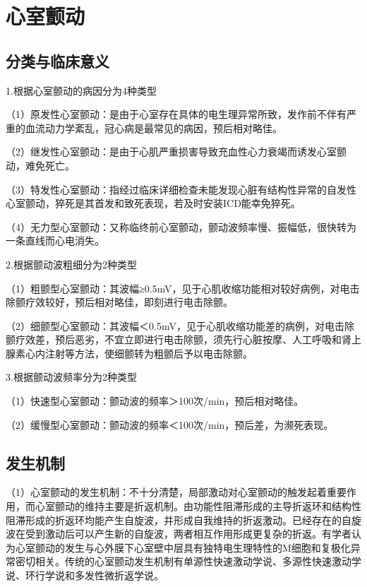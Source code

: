 \protect\hypertarget{text00020.htmlux5cux23subid216}{}{}

\section{心室颤动}

\protect\hypertarget{text00020.htmlux5cux23subid217}{}{}

\subsection{分类与临床意义}

1.根据心室颤动的病因分为4种类型

（1）原发性心室颤动：是由于心室存在具体的电生理异常所致，发作前不伴有严重的血流动力学紊乱，冠心病是最常见的病因，预后相对略佳。

（2）继发性心室颤动：是由于心肌严重损害导致充血性心力衰竭而诱发心室颤动，难免死亡。

（3）特发性心室颤动：指经过临床详细检查未能发现心脏有结构性异常的自发性心室颤动，猝死是其首发和致死表现，若及时安装ICD能幸免猝死。

（4）无力型心室颤动：又称临终前心室颤动，颤动波频率慢、振幅低，很快转为一条直线而心电消失。

2.根据颤动波粗细分为2种类型

（1）粗颤型心室颤动：其波幅≥0.5mV，见于心肌收缩功能相对较好病例，对电击除颤疗效较好，预后相对略佳，即刻进行电击除颤。

（2）细颤型心室颤动：其波幅＜0.5mV，见于心肌收缩功能差的病例，对电击除颤疗效差，预后恶劣，不宜立即进行电击除颤，须先行心脏按摩、人工呼吸和肾上腺素心内注射等方法，使细颤转为粗颤后予以电击除颤。

3.根据颤动波频率分为2种类型

（1）快速型心室颤动：颤动波的频率＞100次/min，预后相对略佳。

（2）缓慢型心室颤动：颤动波的频率＜100次/min，预后差，为濒死表现。

\protect\hypertarget{text00020.htmlux5cux23subid218}{}{}

\subsection{发生机制}

（1）心室颤动的发生机制：不十分清楚，局部激动对心室颤动的触发起着重要作用，而心室颤动的维持主要是折返机制。由功能性阻滞形成的主导折返环和结构性阻滞形成的折返环均能产生自旋波，并形成自我维持的折返激动。已经存在的自旋波在受到激动后可以产生新的自旋波，两者相互作用形成更复杂的折返。有学者认为心室颤动的发生与心外膜下心室壁中层具有独特电生理特性的M细胞和复极化异常密切相关。传统的心室颤动发生机制有单源性快速激动学说、多源性快速激动学说、环行学说和多发性微折返学说。

